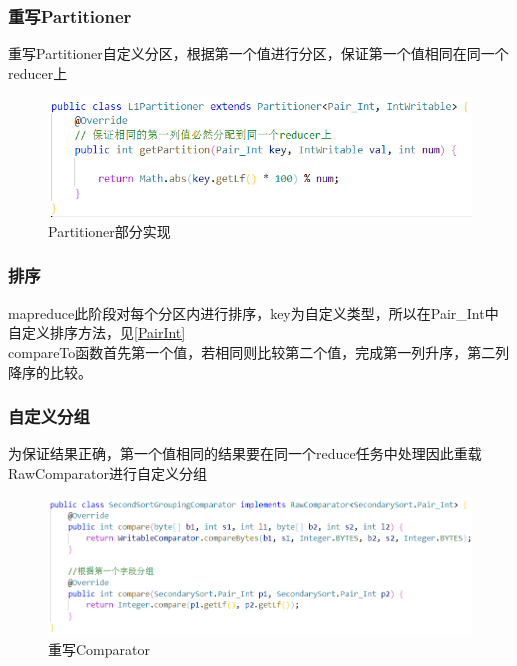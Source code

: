 \documentclass[a4paper,UTF8]{article}
\numberwithin{equation}{section}
\begin{document}
\subsubsection{重写Partitioner}
重写Partitioner自定义分区，根据第一个值进行分区，保证第一个值相同在同一个reducer上
\begin{figure}[H]
    \centering

    \includegraphics[width = 15cm]{part1.png}

    \caption{Partitioner部分实现}
\end{figure}
\subsubsection{排序}
mapreduce此阶段对每个分区内进行排序，key为自定义类型，所以在Pair\_Int中自定义排序方法，见\ref{PairInt}\\
compareTo函数首先第一个值，若相同则比较第二个值，完成第一列升序，第二列降序的比较。

\subsubsection{自定义分组}
为保证结果正确，第一个值相同的结果要在同一个reduce任务中处理因此重载RawComparator进行自定义分组
\begin{figure}[H]
    \centering

    \includegraphics[width = 15cm]{comp1.png}

    \caption{重写Comparator}
\end{figure}
\end{document}
